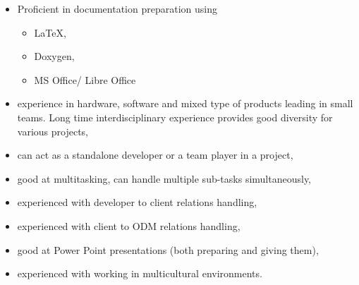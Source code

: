 \documentclass{tccv}
\begin{document}
\begin{itemize}
	\item Proficient in documentation preparation using 
	\begin{itemize}
		\item \LaTeX, 
		\item Doxygen,
		\item MS Office/ Libre Office
	\end{itemize}
	\item experience in hardware, software and mixed type of products leading in small teams. Long time interdisciplinary experience provides good diversity for various projects,
	\item can act as a standalone developer or a team player in a project,
	\item good at multitasking, can handle multiple sub-tasks simultaneously,
	\item experienced with developer to client relations handling,
	\item experienced with client to ODM relations handling,
	\item good at Power Point presentations (both preparing and giving them),
	\item experienced with working in multicultural environments.
	 
\end{itemize}
\end{document}
